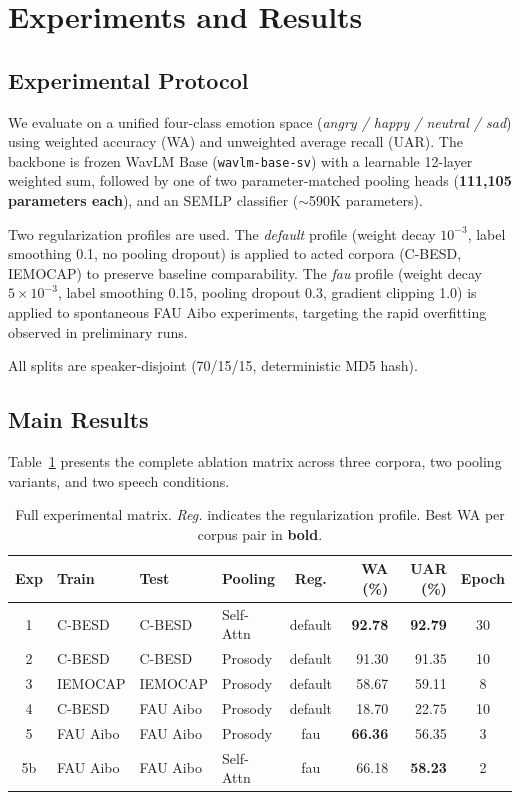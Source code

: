 \section{Experiments and Results}
\label{sec:experiments_results}

\subsection{Experimental Protocol}

We evaluate on a unified four-class emotion space (\textit{angry / happy / neutral / sad}) using weighted accuracy (WA) and unweighted average recall (UAR).
The backbone is frozen WavLM Base (\texttt{wavlm-base-sv}) with a learnable 12-layer weighted sum, followed by one of two parameter-matched pooling heads (\textbf{111,105 parameters each}), and an SEMLP classifier ($\sim$590K parameters).

Two regularization profiles are used.
The \textit{default} profile (weight decay $10^{-3}$, label smoothing 0.1, no pooling dropout) is applied to acted corpora (C-BESD, IEMOCAP) to preserve baseline comparability.
The \textit{fau} profile (weight decay $5\times10^{-3}$, label smoothing 0.15, pooling dropout 0.3, gradient clipping 1.0) is applied to spontaneous FAU Aibo experiments, targeting the rapid overfitting observed in preliminary runs.

All splits are speaker-disjoint (70/15/15, deterministic MD5 hash).

\subsection{Main Results}
\label{ssec:main_results}

Table~\ref{tab:main_matrix} presents the complete ablation matrix across three corpora, two pooling variants, and two speech conditions.

\begin{table}[t]
\centering
\caption{Full experimental matrix. \textit{Reg.} indicates the regularization profile. Best WA per corpus pair in \textbf{bold}.}
\label{tab:main_matrix}
\begin{tabular}{clllcrrc}
\toprule
Exp & Train & Test & Pooling & Reg. & WA (\%) & UAR (\%) & Epoch \\
\midrule
1 & C-BESD & C-BESD & Self-Attn    & default & \textbf{92.78} & \textbf{92.79} & 30 \\
2 & C-BESD & C-BESD & Prosody      & default & 91.30 & 91.35 & 10 \\
\midrule
3 & IEMOCAP & IEMOCAP & Prosody    & default & 58.67 & 59.11 & 8 \\
\midrule
4 & C-BESD & FAU Aibo & Prosody    & default & 18.70 & 22.75 & 10 \\
\midrule
5 & FAU Aibo & FAU Aibo & Prosody  & fau & \textbf{66.36} & 56.35 & 3 \\
5b & FAU Aibo & FAU Aibo & Self-Attn & fau & 66.18 & \textbf{58.23} & 2 \\
\bottomrule
\end{tabular}
\end{table}

